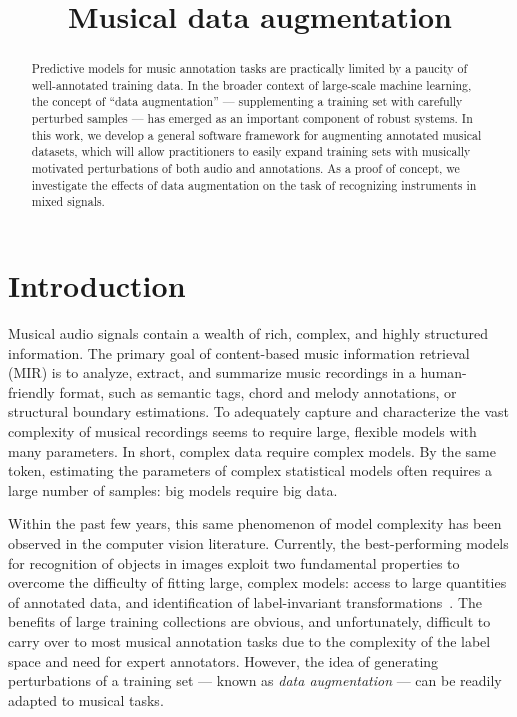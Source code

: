 \documentclass{article}
\title{Musical data augmentation}
\begin{document}
%
\maketitle
%
\begin{abstract}
Predictive models for music annotation tasks are practically limited by a paucity of
well-annotated training data.
In the broader context of large-scale machine learning, the concept of ``data
augmentation'' --- supplementing a training set with carefully perturbed samples ---
has emerged as an important component of robust systems.
In this work, we develop a general software framework for augmenting annotated
musical datasets, which will allow practitioners to easily expand training sets
with musically motivated perturbations of both audio and annotations.
As a proof of concept, we investigate the effects of data augmentation on
the task of recognizing instruments in mixed signals.
\end{abstract}
%
\section{Introduction}
\label{sec:introduction}


Musical audio signals contain a wealth of rich, complex, and highly structured
information.  The primary goal of content-based music information retrieval (MIR) is to
analyze, extract, and summarize music recordings in a human-friendly
format, such as semantic tags, chord and melody annotations, or structural boundary
estimations.  To adequately capture and characterize the vast complexity of musical
recordings seems to require large, flexible models with many parameters.
In short, complex data require complex models.
By the same token, estimating the parameters of complex statistical models often requires
a large number of samples: big models require big data.

Within the past few years, this same phenomenon of model complexity has been observed
in the computer vision literature.  Currently, the best-performing models for recognition
of objects in images exploit two fundamental properties to overcome the difficulty of
fitting large, complex models: access to large quantities of annotated data, and
identification of label-invariant transformations~\cite{krizhevsky2012imagenet}.
The benefits of large training collections are obvious, and unfortunately, difficult to
carry over to most musical annotation tasks due to the complexity of the label space and
need for expert annotators.  However, the idea of generating perturbations of a training
set --- known as \emph{data augmentation} --- can be readily adapted to musical tasks.
\end{document}
